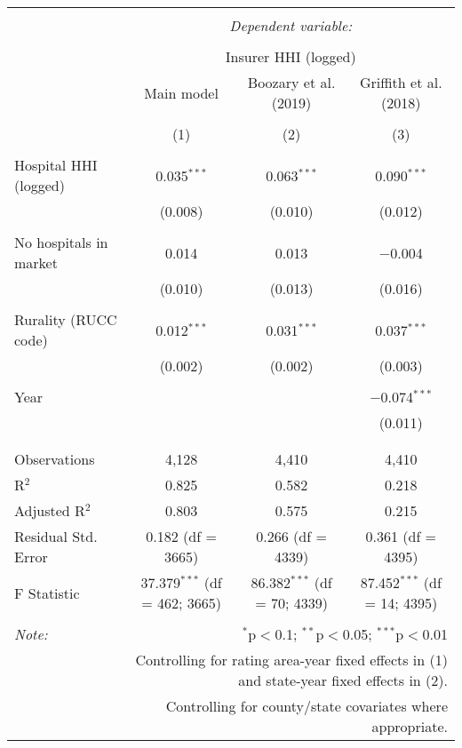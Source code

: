 
\begingroup 
\scriptsize 
\begin{tabular}{@{\extracolsep{5pt}}lccc} 
\\[-1.8ex]\hline 
\hline \\[-1.8ex] 
 & \multicolumn{3}{c}{\textit{Dependent variable:}} \\ 
\cline{2-4} 
\\[-1.8ex] & \multicolumn{3}{c}{Insurer HHI (logged)} \\ 
 & Main model & Boozary et al. (2019) & Griffith et al. (2018) \\ 
\\[-1.8ex] & (1) & (2) & (3)\\ 
\hline \\[-1.8ex] 
 Hospital HHI (logged) & 0.035$^{***}$ & 0.063$^{***}$ & 0.090$^{***}$ \\ 
  & (0.008) & (0.010) & (0.012) \\ 
  & & & \\ 
 No hospitals in market & 0.014 & 0.013 & $-$0.004 \\ 
  & (0.010) & (0.013) & (0.016) \\ 
  & & & \\ 
 Rurality (RUCC code) & 0.012$^{***}$ & 0.031$^{***}$ & 0.037$^{***}$ \\ 
  & (0.002) & (0.002) & (0.003) \\ 
  & & & \\ 
 Year &  &  & $-$0.074$^{***}$ \\ 
  &  &  & (0.011) \\ 
  & & & \\ 
\hline \\[-1.8ex] 
Observations & 4,128 & 4,410 & 4,410 \\ 
R$^{2}$ & 0.825 & 0.582 & 0.218 \\ 
Adjusted R$^{2}$ & 0.803 & 0.575 & 0.215 \\ 
Residual Std. Error & 0.182 (df = 3665) & 0.266 (df = 4339) & 0.361 (df = 4395) \\ 
F Statistic & 37.379$^{***}$ (df = 462; 3665) & 86.382$^{***}$ (df = 70; 4339) & 87.452$^{***}$ (df = 14; 4395) \\ 
\hline 
\hline \\[-1.8ex] 
\textit{Note:}  & \multicolumn{3}{r}{$^{*}$p$<$0.1; $^{**}$p$<$0.05; $^{***}$p$<$0.01} \\ 
 & \multicolumn{3}{r}{Controlling for rating area-year fixed effects in (1) and state-year fixed effects in (2).} \\ 
 & \multicolumn{3}{r}{Controlling for county/state covariates where appropriate.} \\ 
\end{tabular} 
\endgroup 
